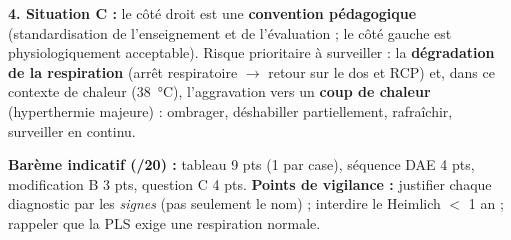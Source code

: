 \documentclass[11pt]{article}
\begin{document}
\begin{corrige}
\textbf{4. Situation C :} le côté droit est une \textbf{convention pédagogique} (standardisation de l'enseignement et de l'évaluation ; le côté gauche est physiologiquement acceptable). Risque prioritaire à surveiller : la \textbf{dégradation de la respiration} (arrêt respiratoire $\rightarrow$ retour sur le dos et RCP) et, dans ce contexte de chaleur (\SI{38}{\celsius}), l'aggravation vers un \textbf{coup de chaleur} (hyperthermie majeure) : ombrager, déshabiller partiellement, rafraîchir, surveiller en continu.

\textbf{Barème indicatif (/20) :} tableau 9 pts (1 par case), séquence DAE 4 pts, modification B 3 pts, question C 4 pts. \textbf{Points de vigilance :} justifier chaque diagnostic par les \emph{signes} (pas seulement le nom) ; interdire le Heimlich $<$ 1 an ; rappeler que la PLS exige une respiration normale.
\end{corrige}
\end{document}
